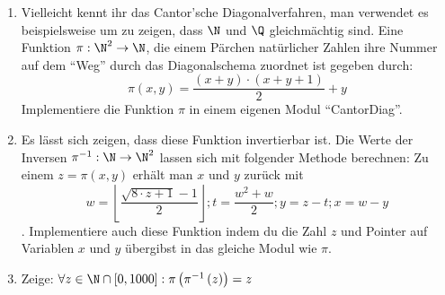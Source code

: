 \begin{aufg}
\begin{enumerate}
\item Vielleicht kennt ihr das Cantor'sche Diagonalverfahren, man verwendet es beispielsweise um zu zeigen, dass $\N$ und $\Q$ gleichmächtig sind. Eine Funktion $\pi: \N^2 \rightarrow \N$, die einem Pärchen natürlicher Zahlen ihre Nummer auf dem "`Weg"' durch das Diagonalschema zuordnet ist gegeben durch: \[
	\pi(x, y) = \frac{(x+y) \cdot (x+y+1)}{2} + y \]
Implementiere die Funktion $\pi$ in einem eigenen Modul "`CantorDiag"'.
\item Es lässt sich zeigen, dass diese Funktion invertierbar ist. Die Werte der Inversen $\pi^{-1}: \N \rightarrow \N^2$ lassen sich mit folgender Methode berechnen: Zu einem $z = \pi(x, y)$ erhält man $x$ und $y$ zurück mit \[
w = \left\lfloor \frac{\sqrt{8\cdot z + 1}-1}{2} \right\rfloor;
t = \frac{w^2 + w}{2};
y = z - t;
x = w -y \]. Implementiere auch diese Funktion indem du die Zahl $z$ und Pointer auf Variablen $x$ und $y$ übergibst in das gleiche Modul wie $\pi$. 
\item Zeige: $\forall z \in \N \cap [0, 1000]: \pi\left(\pi^{-1}\left(z\right)\right) = z$
\end{enumerate}
\end{aufg}